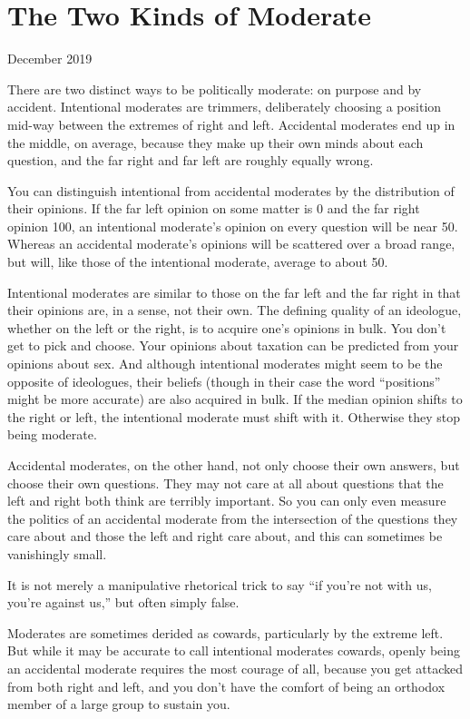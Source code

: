 \chapter{The Two Kinds of Moderate}

December 2019

There are two distinct ways to be politically moderate: on purpose and
by accident. Intentional moderates are trimmers, deliberately choosing a
position mid-way between the extremes of right and left. Accidental
moderates end up in the middle, on average, because they make up their
own minds about each question, and the far right and far left are
roughly equally wrong.

You can distinguish intentional from accidental moderates by the
distribution of their opinions. If the far left opinion on some matter
is 0 and the far right opinion 100, an intentional moderate's opinion on
every question will be near 50. Whereas an accidental moderate's
opinions will be scattered over a broad range, but will, like those of
the intentional moderate, average to about 50.

Intentional moderates are similar to those on the far left and the far
right in that their opinions are, in a sense, not their own. The
defining quality of an ideologue, whether on the left or the right, is
to acquire one's opinions in bulk. You don't get to pick and choose.
Your opinions about taxation can be predicted from your opinions about
sex. And although intentional moderates might seem to be the opposite of
ideologues, their beliefs (though in their case the word ``positions''
might be more accurate) are also acquired in bulk. If the median opinion
shifts to the right or left, the intentional moderate must shift with
it. Otherwise they stop being moderate.

Accidental moderates, on the other hand, not only choose their own
answers, but choose their own questions. They may not care at all about
questions that the left and right both think are terribly important. So
you can only even measure the politics of an accidental moderate from
the intersection of the questions they care about and those the left and
right care about, and this can sometimes be vanishingly small.

It is not merely a manipulative rhetorical trick to say ``if you're not
with us, you're against us,'' but often simply false.

Moderates are sometimes derided as cowards, particularly by the extreme
left. But while it may be accurate to call intentional moderates
cowards, openly being an accidental moderate requires the most courage
of all, because you get attacked from both right and left, and you don't
have the comfort of being an orthodox member of a large group to sustain
you.

